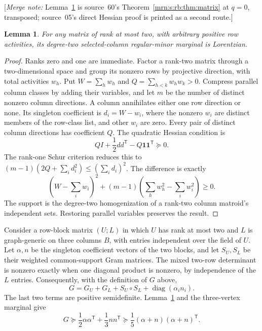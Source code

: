 \documentclass[11pt,a4paper]{article}
\newtheorem{lemma}[theorem]{Lemma}
\theoremstyle{remark}\newtheorem{remark}[theorem]{Remark}
\newcommand{\mnote}[1]{[\textit{Merge note:} #1]}
\begin{document}
\mnote{Lemma~\ref{mrn:s:sn:lem:ranktwo} is source~60's Theorem~\ref{mrn:s:rb:thm:matrix} at $q=0$, transposed; source~05's direct Hessian proof is printed as a second route.}
\begin{lemma}\label{mrn:s:sn:lem:ranktwo}
For any matrix of rank at most two, with arbitrary positive row activities,
its degree-two selected-column regular-minor marginal is Lorentzian.
\end{lemma}
\begin{proof}
Ranks zero and one are immediate. Factor a rank-two matrix through a
two-dimensional space and group its nonzero rows by projective direction, with
total activities $w_h$. Put $W=\sum_hw_h$ and $Q=\sum_{h<k}w_hw_k>0$.
Compress parallel column classes by adding their variables, and let $m$ be the
number of distinct nonzero column directions.
A column annihilates either one row direction or none. Its singleton
coefficient is $d_i=W-w_i$, where the nonzero $w_i$ are distinct members of
the row-class list, and other $w_i$ are zero.
Every pair of distinct column directions has coefficient $Q$.
The quadratic Hessian condition is
\[
 QI+\frac12dd^{\mathsf T}-Q\mathbf1\mathbf1^{\mathsf T}\succeq0.
\]
The rank-one Schur criterion reduces this to
$(m-1)(2Q+\sum_i d_i^2)\le(\sum_i d_i)^2$.
The difference is exactly
\[
 \left(W-\sum_iw_i\right)^2+
       (m-1)\left(\sum_hw_h^2-\sum_iw_i^2\right)\ge0.
\]
The support is the degree-two homogenization of a rank-two column matroid's
independent sets. Restoring parallel variables preserves the result.
\end{proof}

Consider a row-block matrix $(U;L)$ in which $U$ has rank at most two and $L$
is graph-generic on three columns $B$, with entries independent over the
field of $U$. Let $\alpha,n$ be the singleton coefficient vectors of the
two blocks, and let $S_U,S_L$ be their weighted common-support Gram matrices.
The mixed two-row determinant is nonzero exactly when one diagonal product
is nonzero, by independence of the $L$ entries. Consequently, with the
definition of $G$ above,
\[
 G=G_U+G_L+S_U\circ S_L+\operatorname{diag}(\alpha_i n_i).
\]
The last two terms are positive semidefinite. Lemma~\ref{mrn:s:sn:lem:ranktwo} and
the three-vertex marginal give
\begin{equation}\label{mrn:s:sn:eq:mixed}
 G\succeq\frac12\alpha\alpha^{\mathsf T}+\frac13nn^{\mathsf T}
       \succeq\frac15(\alpha+n)(\alpha+n)^{\mathsf T}.
\end{equation}
\end{document}
